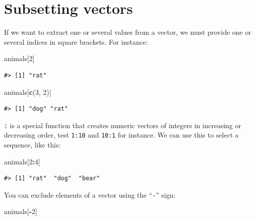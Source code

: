 \documentclass[]{book}
\newenvironment{Shaded}{\begin{snugshade}}{\end{snugshade}}
\newcommand{\KeywordTok}[1]{\textcolor[rgb]{0.13,0.29,0.53}{\textbf{#1}}}
\newcommand{\DecValTok}[1]{\textcolor[rgb]{0.00,0.00,0.81}{#1}}
\newcommand{\OperatorTok}[1]{\textcolor[rgb]{0.81,0.36,0.00}{\textbf{#1}}}
\newcommand{\NormalTok}[1]{#1}
\theoremstyle{definition}
\theoremstyle{definition}
\theoremstyle{definition}
\theoremstyle{remark}
\begin{document}
\section{Subsetting vectors}\label{subsetting-vectors}

If we want to extract one or several values from a vector, we must
provide one or several indices in square brackets. For instance:

\begin{Shaded}
\begin{Highlighting}[]
\NormalTok{animals[}\DecValTok{2}\NormalTok{]}
\end{Highlighting}
\end{Shaded}

\begin{verbatim}
#> [1] "rat"
\end{verbatim}

\begin{Shaded}
\begin{Highlighting}[]
\NormalTok{animals[}\KeywordTok{c}\NormalTok{(}\DecValTok{3}\NormalTok{, }\DecValTok{2}\NormalTok{)]}
\end{Highlighting}
\end{Shaded}

\begin{verbatim}
#> [1] "dog" "rat"
\end{verbatim}

\texttt{:} is a special function that creates numeric vectors of
integers in increasing or decreasing order, test \texttt{1:10} and
\texttt{10:1} for instance. We can use this to select a sequence, like
this:

\begin{Shaded}
\begin{Highlighting}[]
\NormalTok{animals[}\DecValTok{2}\OperatorTok{:}\DecValTok{4}\NormalTok{]}
\end{Highlighting}
\end{Shaded}

\begin{verbatim}
#> [1] "rat"  "dog"  "bear"
\end{verbatim}

You can exclude elements of a vector using the ``\texttt{-}'' sign:

\begin{Shaded}
\begin{Highlighting}[]
\NormalTok{animals[}\OperatorTok{-}\DecValTok{2}\NormalTok{]}
\end{Highlighting}
\end{Shaded}
\end{document}
